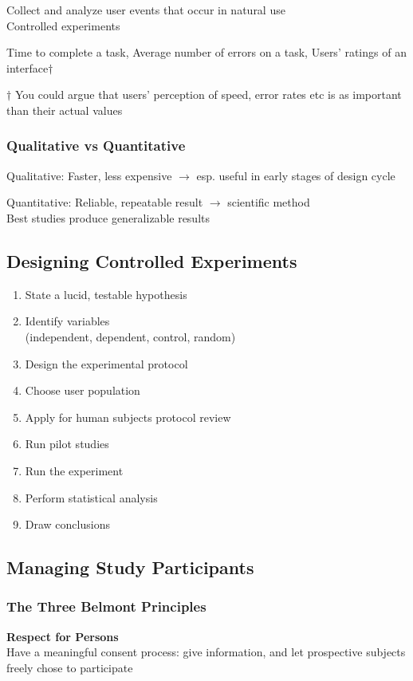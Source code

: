 Collect and analyze user events that occur in natural use\\
Controlled experiments

Time to complete a task, Average number of errors on a task, Users’ ratings of an interface$\dagger$

$\dagger$ You could argue that users’ perception of speed, error rates etc is as
important than their actual values

\subsubsection{Qualitative vs Quantitative}
Qualitative: Faster, less expensive $\to$ esp. useful in early stages of design cycle

Quantitative: Reliable, repeatable result $\to$ scientific method\\
Best studies produce generalizable results

\subsection{Designing Controlled Experiments}
\begin{enumerate}
    \item State a lucid, testable hypothesis
    \item Identify variables\\
    (independent, dependent, control, random)
    \item Design the experimental protocol
    \item Choose user population
    \item Apply for human subjects protocol review
    \item Run pilot studies
    \item Run the experiment
    \item Perform statistical analysis
    \item Draw conclusions
\end{enumerate}

\subsection{Managing Study Participants}
\subsubsection{The Three Belmont Principles}
\textbf{Respect for Persons}\\
Have a meaningful consent process: give information, and let prospective subjects freely chose to participate


